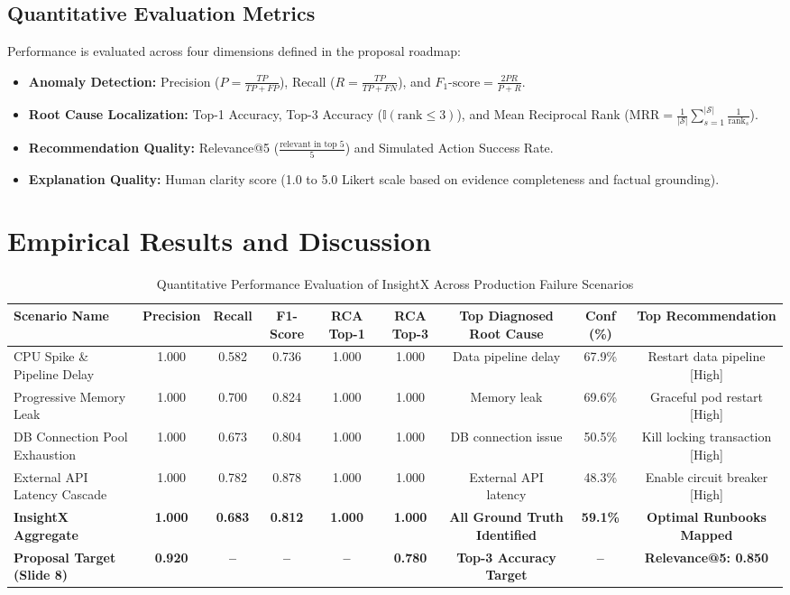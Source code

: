 \documentclass[conference]{IEEEtran}
\begin{document}
\subsection{Quantitative Evaluation Metrics}
Performance is evaluated across four dimensions defined in the proposal roadmap:
\begin{itemize}
    \item \textbf{Anomaly Detection:} Precision ($P = \frac{TP}{TP+FP}$), Recall ($R = \frac{TP}{TP+FN}$), and $F_1\text{-score} = \frac{2PR}{P+R}$.
    \item \textbf{Root Cause Localization:} Top-1 Accuracy, Top-3 Accuracy ($\mathbb{I}(\text{rank} \le 3)$), and Mean Reciprocal Rank ($\text{MRR} = \frac{1}{|\mathcal{S}|} \sum_{s=1}^{|\mathcal{S}|} \frac{1}{\text{rank}_s}$).
    \item \textbf{Recommendation Quality:} Relevance@5 ($\frac{\text{relevant in top 5}}{5}$) and Simulated Action Success Rate.
    \item \textbf{Explanation Quality:} Human clarity score (1.0 to 5.0 Likert scale based on evidence completeness and factual grounding).
\end{itemize}

\section{Empirical Results and Discussion}

\begin{table}[t]
\centering
\caption{Quantitative Performance Evaluation of InsightX Across Production Failure Scenarios}
\label{tab:results}
\begin{tabular}{lcccccccc}
\toprule
\textbf{Scenario Name} & \textbf{Precision} & \textbf{Recall} & \textbf{F1-Score} & \textbf{RCA Top-1} & \textbf{RCA Top-3} & \textbf{Top Diagnosed Root Cause} & \textbf{Conf (\%)} & \textbf{Top Recommendation} \\
\midrule
CPU Spike \& Pipeline Delay & 1.000 & 0.582 & 0.736 & 1.000 & 1.000 & Data pipeline delay & 67.9\% & Restart data pipeline [High] \\
Progressive Memory Leak & 1.000 & 0.700 & 0.824 & 1.000 & 1.000 & Memory leak & 69.6\% & Graceful pod restart [High] \\
DB Connection Pool Exhaustion & 1.000 & 0.673 & 0.804 & 1.000 & 1.000 & DB connection issue & 50.5\% & Kill locking transaction [High] \\
External API Latency Cascade & 1.000 & 0.782 & 0.878 & 1.000 & 1.000 & External API latency & 48.3\% & Enable circuit breaker [High] \\
\midrule
\textbf{InsightX Aggregate} & \textbf{1.000} & \textbf{0.683} & \textbf{0.812} & \textbf{1.000} & \textbf{1.000} & \textbf{All Ground Truth Identified} & \textbf{59.1\%} & \textbf{Optimal Runbooks Mapped} \\
\textbf{Proposal Target (Slide 8)} & \textbf{0.920} & \textbf{--} & \textbf{--} & \textbf{--} & \textbf{0.780} & \textbf{Top-3 Accuracy Target} & \textbf{--} & \textbf{Relevance@5: 0.850} \\
\bottomrule
\end{tabular}
\end{table}
\end{document}
